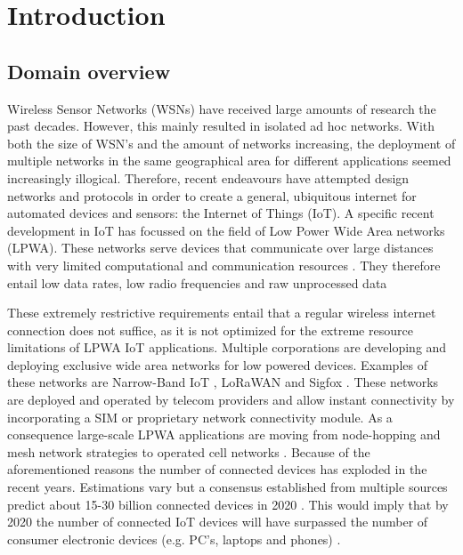 \chapter{Introduction}

\section{Domain overview} 
Wireless Sensor Networks (WSNs) have received large amounts of research the past decades. However, this mainly resulted in isolated ad hoc networks. With both the size of WSN's and the amount of networks increasing, the deployment of multiple networks in the same geographical area for different applications seemed increasingly illogical. Therefore, recent endeavours have attempted design networks and protocols in order to create a general, ubiquitous internet for automated devices and sensors: the Internet of Things (IoT). A specific recent development in IoT has focussed on the field of Low Power Wide Area networks (LPWA). These networks serve devices that communicate over large distances with very limited computational and communication resources \cite{value_of}. They therefore entail low data rates, low radio frequencies and raw unprocessed data

These extremely restrictive requirements entail that a regular wireless internet connection does not suffice, as it is not optimized for the extreme resource limitations of LPWA IoT applications. Multiple corporations are developing and deploying exclusive wide area networks for low powered devices. Examples of these networks are Narrow-Band IoT \cite{nbiot}, LoRaWAN \cite{web:lora} and Sigfox \cite{web:sigfox}. These networks are deployed and operated by telecom providers and allow instant connectivity by incorporating a SIM or proprietary network connectivity module. As a consequence large-scale LPWA applications are moving from node-hopping and mesh network strategies to operated cell networks \cite{movement_to_cellular, movement_to_cellular_2}. Because of the aforementioned reasons the number of connected devices has exploded in the recent years. Estimations vary but a consensus established from multiple sources predict about 15-30 billion connected devices in 2020 \cite{nr_devices_gartner, nr_devices_forbes, security_risks_ocean_connect, nr_devices_ericsson}. This would imply that by 2020 the number of connected IoT devices will have surpassed the number of consumer electronic devices (e.g. PC's, laptops and phones) \cite{nr_devices_ericsson}.

